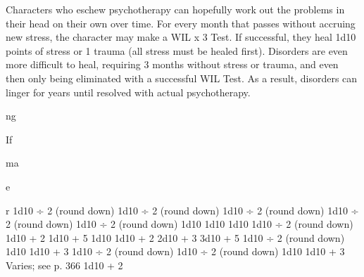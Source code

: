 Characters who eschew psychotherapy can hopefully 
work out the problems in their head on their own over 
time. For every month that passes without accruing 
new stress, the character may make a WIL x 3 Test. If 
successful, they heal 1d10 points of stress or 1 trauma 
(all stress must be healed first). Disorders are even more 
difficult to heal, requiring 3 months without stress or 
trauma, and even then only being eliminated with a 
successful WIL Test. As a result, disorders can linger 
for years until resolved with actual psychotherapy.

ng

If 

ma 

e

r 
1d10 ÷ 2 (round down)
1d10 ÷ 2 (round down)
1d10 ÷ 2 (round down)
1d10 ÷ 2 (round down)
1d10 ÷ 2 (round down)
1d10
1d10
1d10
1d10 ÷ 2 (round down)
1d10 + 2
1d10 + 5
1d10
1d10 + 2
2d10 + 3
3d10 + 5
1d10 ÷ 2 (round down)
1d10
1d10 + 3
1d10 ÷ 2 (round down)
1d10 ÷ 2 (round down)
1d10
1d10 + 3
Varies; see p. 366
1d10 + 2
